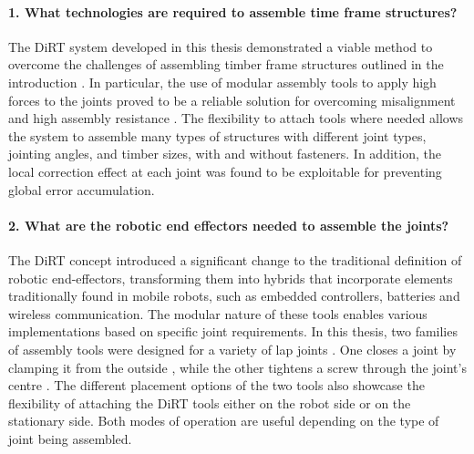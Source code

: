 	\paragraph{1. What technologies are required to assemble time frame structures?}

The DiRT system developed in this thesis demonstrated a viable method to overcome the challenges of assembling timber frame structures outlined in the introduction . In particular, the use of modular assembly tools to apply high forces to the joints proved to be a reliable solution for overcoming misalignment  and high assembly resistance . The flexibility to attach tools where needed allows the system to assemble many types of structures with different joint types, jointing angles, and timber sizes, with and without fasteners. In addition, the local correction effect at each joint was found to be exploitable for preventing global error accumulation.

\paragraph{2. What are the robotic end effectors needed to assemble the joints?}

The DiRT concept introduced a significant change to the traditional definition of robotic end-effectors, transforming them into hybrids that incorporate elements traditionally found in mobile robots, such as embedded controllers, batteries and wireless communication. The modular nature of these tools enables various implementations based on specific joint requirements. In this thesis, two families of assembly tools were designed for a variety of lap joints . One closes a joint by clamping it from the outside , while the other tightens a screw through the joint's centre . The different placement options of the two tools also showcase the flexibility of attaching the DiRT tools either on the robot side or on the stationary side. Both modes of operation are useful depending on the type of joint being assembled.

